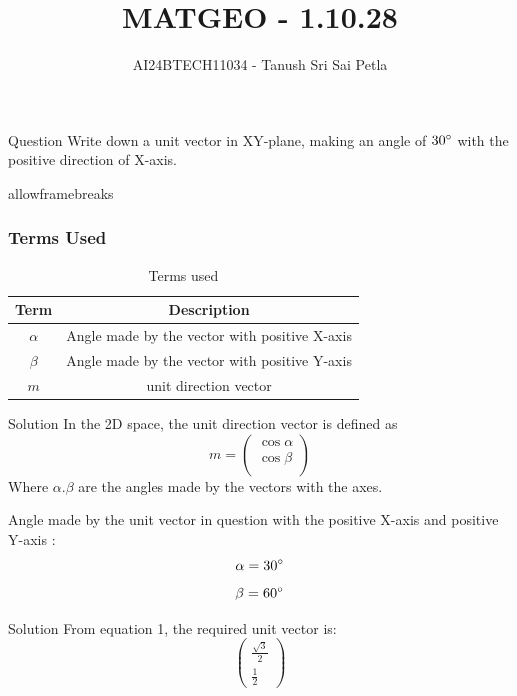 \documentclass{beamer}
\begin{document}
\title{MATGEO - 1.10.28}
\author{AI24BTECH11034 - Tanush Sri Sai Petla}
\date{}
\frame{\titlepage}

\begin{frame}{Question}
Write down a unit vector in XY-plane, making an angle of $30\degree$ with the positive direction of X-axis.
\end{frame}

\begin{frame}{allowframebreaks}
\frametitle{Terms Used}
\begin{table}[htbp]
    \centering
    \caption{Terms used}
    \label{tab:parameters}
    \begin{tabular}[12ptx]{ |c| c|}
    \hline\textbf{Term} & \textbf{Description}\\
    \hline
    $\alpha$&Angle made by the vector with positive X-axis \\
    \hline
    $\beta$&Angle made by the vector with positive Y-axis \\
    \hline
    $m$&unit direction vector\\
    \hline
    \end{tabular}
\end{table}
\end{frame}
\begin{frame}{Solution}
In the 2D space, the unit direction vector is defined as\\
\begin{equation}
    m=\begin{pmatrix}
        \cos\alpha\\
        \cos\beta\\
    \end{pmatrix}
\end{equation}
Where $\alpha.\beta$ are the angles made by the vectors with the axes.

Angle made by the unit vector in question with the positive X-axis and positive Y-axis $\colon$\\
\begin{equation}
    \alpha=30\degree
\end{equation}
\begin{equation}
    \beta=60\degree
\end{equation}
\end{frame}
\begin{frame}{Solution}
From equation 1, the required unit vector is$\colon$
\begin{equation*}
    \begin{pmatrix}
        \frac{\sqrt{3}}{2}\\
        \frac{1}{2}
    \end{pmatrix}
\end{equation*} 
\end{frame}
\end{document}
